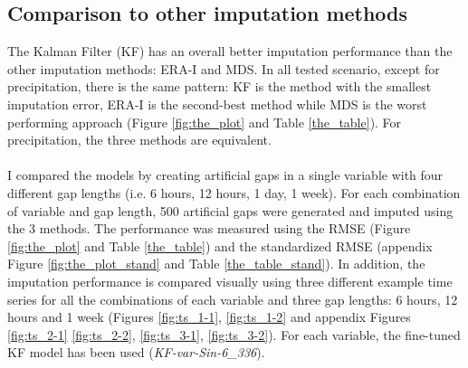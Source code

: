 \documentclass{article}
\let\Oldsubsection\subsection
\renewcommand{\subsection}{\FloatBarrier\Oldsubsection}
\begin{document}


\subsection{Comparison to other imputation methods}

The Kalman Filter (KF) has an overall better imputation performance than the other imputation methods: ERA-I and MDS. In all tested scenario, except for precipitation, there is the same pattern: KF is the method with the smallest imputation error, ERA-I is the second-best method while MDS is the worst performing approach (Figure \ref{fig:the_plot} and Table \ref{the_table}). For precipitation, the three methods are equivalent.

\paragraph{} I compared the models by creating artificial gaps in a single variable with four different gap lengths (i.e. 6 hours, 12 hours, 1 day, 1 week). For each combination of variable and gap length, 500 artificial gaps were generated and imputed using the 3 methods. The performance was measured using the RMSE (Figure \ref{fig:the_plot} and Table \ref{the_table}) and the standardized RMSE (appendix Figure \ref{fig:the_plot_stand} and Table \ref{the_table_stand}). In addition, the imputation performance is compared visually using three different example time series for all the combinations of each variable and three gap lengths: 6 hours, 12 hours and 1 week (Figures \ref{fig:ts_1-1}, \ref{fig:ts_1-2} and appendix Figures \ref{fig:ts_2-1} \ref{fig:ts_2-2}, \ref{fig:ts_3-1}, \ref{fig:ts_3-2}). For each variable, the fine-tuned KF model has been used (\textit{KF-\textlangle var\textrangle-Sin-6\_336}).
\end{document}
